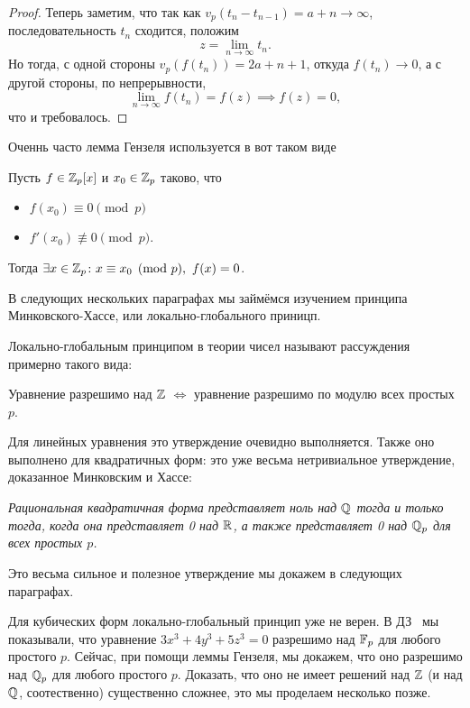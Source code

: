 \begin{proof}
  		Теперь заметим, что так как $v_{p}(t_n - t_{n - 1}) = a + n \to \infty$, последовательность $t_n$ сходится, положим 
  		\[
  			z = \lim_{n \to \infty} t_n.
  		\]
  		Но тогда, с одной стороны $v_{p}(f(t_n)) = 2a + n + 1$, откуда $f(t_n) \to 0$, а с другой стороны, по непрерывности, 
  		\[
  			\lim_{n \to \infty} f(t_n) = f(z) \implies f(z) = 0,
  		\]
  		что и требовалось.
	 \end{proof}

	 Оченнь часто лемма Гензеля используется в вот таком виде 

	 \begin{corollary}\label{weak_Henzel_lemma}
	 	Пусть $f \in \mathbb{Z}_{p}[x]$ и $x_0 \in \mathbb{Z}_{p}$ таково, что 
	 	\begin{itemize}
	 		\item $f(x_0) \equiv 0 \pmod{p}$
	 		\item $f'(x_0) \not\equiv 0 \pmod{p}$. 
	 	\end{itemize}
	 	Тогда $\exists x \in \mathbb{Z}_{p}\colon x \equiv x_0 \pmod{p}, \ f(x) = 0$.
	 \end{corollary}

	 В следующих нескольких параграфах мы займёмся изучением принципа Минковского-Хассе, или локально-глобального приницп. 

	  Локально-глобальным принципом в теории чисел называют рассуждения примерно такого вида: 

	  \begin{center}
	  	Уравнение разрешимо над $\mathbb{Z}$ $\Leftrightarrow$ уравнение разрешимо по модулю всех простых $p$. 
	  \end{center}

	  Для линейных уравнения это утверждение очевидно выполняется. Также оно выполнено для квадратичных форм: это уже весьма нетривиальное утверждение, доказанное Минковским и Хассе: 

	  		\begin{center}
	  		\emph{Рациональная квадратичная форма представляет ноль над $\mathbb{Q}$ тогда и только тогда, когда она представляет 0 над $\mathbb{R}$, а также представляет 0 над $\mathbb{Q}_{p}$ для всех простых $p$.}
	  		\end{center}

	Это весьма сильное и полезное утверждение мы докажем в следующих параграфах. 	
	  	

	Для кубических форм локально-глобальный принцип уже не верен. В ДЗ~\label{hw:10} мы показывали, что уравнение $3x^3 + 4y^3 + 5z^3 = 0$ разрешимо над  $\mathbb{F}_{p}$ для любого простого $p$. Сейчас, при помощи леммы Гензеля, мы докажем, что оно разрешимо над $\mathbb{Q}_{p}$ для любого простого $p$. Доказать, что оно не имеет решений над $\mathbb{Z}$ (и над $\mathbb{Q}$, соотественно) существенно сложнее, это мы проделаем несколько позже. 



